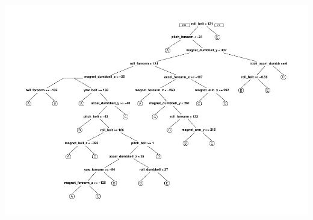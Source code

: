 \documentclass[
]{article}
\begin{document}
\includegraphics{pracmachlearn_files/figure-latex/unnamed-chunk-10-1.pdf}
\end{document}
